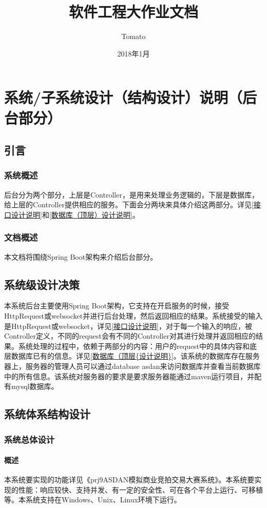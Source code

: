 \documentclass{article}
\title{软件工程大作业文档}
\author{Tomato}
\date{2018年1月}
\begin{document}
	\maketitle
	\section{系统/子系统设计（结构设计）说明（后台部分）}
		\subsection{引言}
			\subsubsection{系统概述}
				后台分为两个部分，上层是Controller，是用来处理业务逻辑的，下层是数据库，给上层的Controller提供相应的服务。下面会分两块来具体介绍这两部分。详见\ref{接口设计说明}和\ref{数据库（顶层）设计说明}。

			\subsubsection{文档概述}
				本文档将围绕Spring Boot架构来介绍后台部分。
		\subsection{系统级设计决策}
			本系统后台主要使用Spring Boot架构，它支持在开启服务的时候，接受HttpRequest或websocket并进行后台处理，然后返回相应的结果。系统接受的输入是HttpRequest或websocket，详见\ref{接口设计说明}，对于每一个输入的响应，被Controller定义，不同的request会有不同的Controller对其进行处理并返回相应的结果。系统处理的过程中，依赖于两部分的内容：用户的request中的具体内容和底层数据库已有的信息。详见\ref{数据库（顶层{设计说明}}。该系统的数据库存在服务器上，服务器的管理人员可以通过database asdan来访问数据库并查看当前数据库中的所有信息。该系统对服务器的要求是要求服务器能通过maven运行项目，并配有mysql数据库。
		\subsection{系统体系结构设计}
			\subsubsection{系统总体设计}
				\paragraph{概述}
					本系统要实现的功能详见《prj9ASDAN模拟商业竞拍交易大赛系统》。本系统要实现的性能：响应较快、支持并发、有一定的安全性、可在各个平台上运行、可移植等。本系统支持在Windows、Unix、Linux环境下运行。
\end{document}
